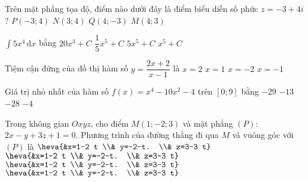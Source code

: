 \begin{ex}%
Trên mặt phẳng tọa độ, điểm nào dưới đây là điểm biểu diễn số phức $z=-3+4 i$?
\choice
{\True $P(-3; 4)$}
{$N(3; 4)$}
{$Q(4;-3)$}
{$M(4; 3)$}

\end{ex}
\begin{ex}%
$\displaystyle\int 5 x^4 \mathrm{\,d} x$ bằng
\choice
{$20 x^3+C$}
{$\dfrac{1}{5} x^5+C$}
{$5 x^5+C$}
{\True $x^5+C$}

\end{ex}
\begin{ex}%
Tiệm cận đứng của đồ thị hàm số $y=\dfrac{2 x+2}{x-1}$ là
\choice
{$x=2$}
{\True $x=1$}
{$x=-2$}
{$x=-1$}

\end{ex}
\begin{ex}%
Giá trị nhỏ nhất của hàm số $f(x)=x^4-10 x^2-4$ trên $[0; 9]$ bằng
\choice
{\True $-29$}
{$-13$}
{$-28$}
{$-4$}

\end{ex}
\begin{ex}%
Trong không gian $O x y z$, cho điểm $M(1;-2; 3)$ và mặt phẳng $(P)$: $2 x-y+3 z+1=0$. Phương trình của đường thẳng đi qua $M$ và vuông góc với $(P)$ là
\choice
{$\heva{&x=1-2 t \\& y=-2-t. \\& z=3-3 t}$}
{$\heva{&x=1-2 t \\& y=-2-t. \\& z=3-3 t}$}
{\True $\heva{&x=1-2 t \\& y=-2-t. \\& z=3-3 t}$}
{$\heva{&x=1-2 t \\& y=-2-t. \\& z=3-3 t}$}

\end{ex}

